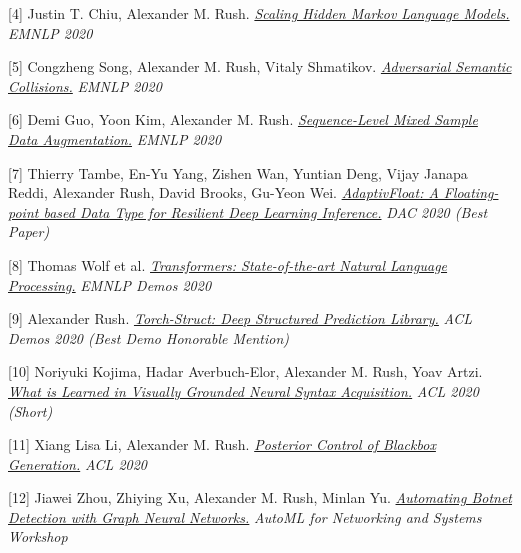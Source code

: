 \documentclass[10pt]{article}
\begin{document}
\medskip


[4] \ind Justin T. Chiu, Alexander M. Rush. \emph{\href{ https://arxiv.org/abs/2011.04640 }{ Scaling Hidden Markov Language Models.} }\emph{ EMNLP 2020 }

\medskip


[5] \ind Congzheng Song, Alexander M. Rush, Vitaly Shmatikov. \emph{\href{ https://www.cs.cornell.edu/~shmat/shmat_emnlp20.pdf }{ Adversarial Semantic Collisions.} }\emph{ EMNLP 2020 }

\medskip


[6] \ind Demi Guo, Yoon Kim, Alexander M. Rush. \emph{\href{ https://www.aclweb.org/anthology/2020.emnlp-main.447/ }{ Sequence-Level Mixed Sample Data Augmentation.} }\emph{ EMNLP 2020 }

\medskip


[7] \ind Thierry Tambe, En-Yu Yang, Zishen Wan, Yuntian Deng, Vijay Janapa Reddi, Alexander Rush, David Brooks, Gu-Yeon Wei. \emph{\href{ https://arxiv.org/pdf/1909.13271 }{ AdaptivFloat: A Floating-point based Data Type for Resilient Deep Learning Inference.} }\emph{ DAC 2020 (Best Paper) }

\medskip


[8] \ind Thomas Wolf et al. \emph{\href{ https://arxiv.org/pdf/1910.03771 }{ Transformers: State-of-the-art Natural Language Processing.} }\emph{ EMNLP Demos 2020 }

\medskip


[9] \ind Alexander Rush. \emph{\href{ https://arxiv.org/pdf/2002.00876 }{ Torch-Struct: Deep Structured Prediction Library.} }\emph{ ACL Demos 2020 (Best Demo Honorable Mention) }

\medskip


[10] \ind Noriyuki Kojima, Hadar Averbuch-Elor, Alexander M. Rush, Yoav Artzi. \emph{\href{ https://arxiv.org/pdf/2005.01678 }{ What is Learned in Visually Grounded Neural Syntax Acquisition.} }\emph{ ACL 2020  (Short) }

\medskip


[11] \ind Xiang Lisa Li, Alexander M. Rush. \emph{\href{ https://arxiv.org/pdf/2005.04560 }{ Posterior Control of Blackbox Generation.} }\emph{ ACL 2020 }

\medskip


[12] \ind Jiawei Zhou, Zhiying Xu, Alexander M. Rush, Minlan Yu. \emph{\href{ https://arxiv.org/pdf/2003.06344 }{ Automating Botnet Detection with Graph Neural Networks.} }\emph{ AutoML for Networking and Systems Workshop }

\medskip
\end{document}

